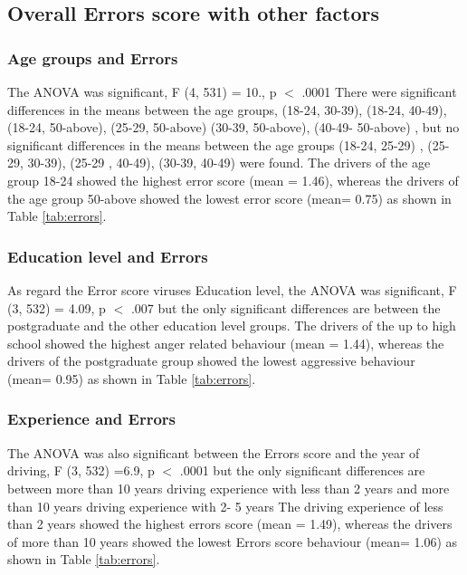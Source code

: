 \documentclass[preprint,12pt,a4paper,authoryear]{elsarticle}
\begin{document}
\subsection{Overall Errors score with other factors}

\subsubsection{Age groups and Errors}

The ANOVA was significant, F (4, 531) = 10., p $<$ .0001 There were significant differences in the means between the age groups, (18-24, 30-39), (18-24, 40-49),  (18-24, 50-above), (25-29, 50-above) (30-39, 50-above), (40-49- 50-above)  , but no significant differences in the means between the age groups (18-24, 25-29) , (25-29, 30-39), (25-29 , 40-49), (30-39, 40-49) were found. The drivers of the age group 18-24 showed the highest error score (mean = 1.46), whereas the drivers of the age group 50-above showed the lowest error score (mean= 0.75) as shown in Table \ref{tab:errors}.

\subsubsection{Education level and Errors}

As regard the Error score viruses Education level, the ANOVA was significant, F (3, 532) = 4.09, p $<$ .007 but the only significant differences are between the postgraduate and the other education level groups. The drivers of the up to high school showed the highest anger related behaviour (mean = 1.44), whereas the drivers of the postgraduate group showed the lowest aggressive behaviour (mean= 0.95) as shown in Table \ref{tab:errors}.

\subsubsection{Experience and Errors}

The ANOVA was also significant between the Errors score and the year of driving, F (3, 532) =6.9, p $<$ .0001 but the only significant differences are between more than 10 years driving experience with less than 2 years and   more than 10 years driving experience with 2- 5 years The driving experience of less than 2 years showed the highest errors score (mean = 1.49), whereas the drivers of more than 10 years showed the lowest Errors score behaviour (mean= 1.06) as shown in Table \ref{tab:errors}.
\end{document}
